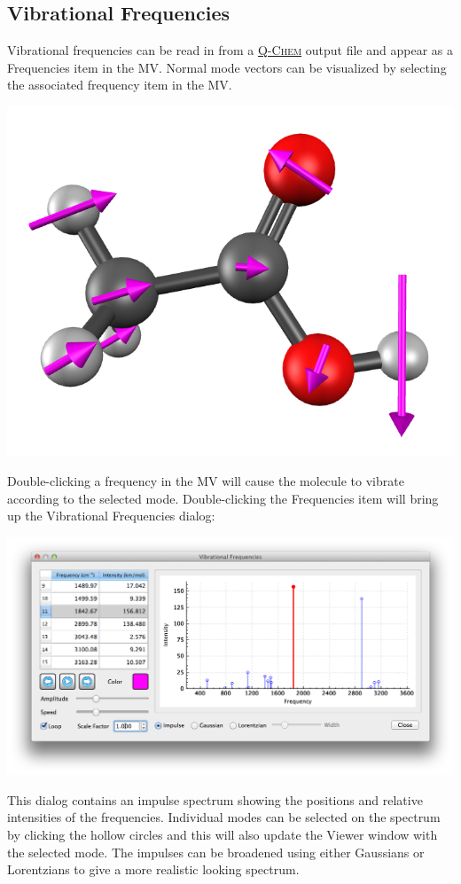 \documentclass[a4paper,12pt]{article}
\newcommand{\qchem}{\href{http://q-chem.com}{{\scshape Q-Chem}}}
\begin{document}
\newpage
\subsection{Vibrational Frequencies}

Vibrational frequencies can be read in from a \qchem{} output file and appear
as a Frequencies item in the MV.  Normal mode vectors can be visualized by
selecting the associated frequency item in the MV.
\begin{center}
\includegraphics[scale=0.25]{figures/VibMode.png} \\
\end{center}
Double-clicking a frequency in the MV will cause the molecule to vibrate
according to the selected mode.  Double-clicking the Frequencies item will
bring up the Vibrational Frequencies dialog:
\begin{center}
\includegraphics[scale=0.40]{figures/Frequencies.png} \\
\end{center}
This dialog contains an impulse spectrum showing the positions and relative
intensities of the frequencies.  Individual modes can be selected on the
spectrum by clicking the hollow circles and this will also update the Viewer
window with the selected mode.  The impulses can be broadened using either
Gaussians or Lorentzians to give a more realistic looking spectrum. \\
\end{document}

